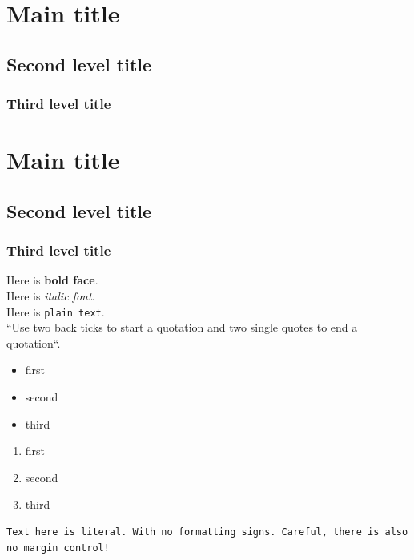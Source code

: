 \documentclass{article}\usepackage[]{graphicx}\usepackage[]{color}
\begin{document}
\section*{Main title}

\subsection*{Second level title}

\subsubsection*{Third level title}


\section{Main title}

\subsection{Second level title}

\subsubsection{Third level title}

Here is \textbf{bold face}.\\
Here is \textit{italic font}.\\
Here is \texttt{plain text}.\\

``Use two back ticks to start a quotation and two single quotes to end a quotation``.

\begin{itemize}
  \item first
  \item second
  \item third
\end{itemize}

\begin{enumerate}
  \item first
  \item second
  \item third
\end{enumerate}

\begin{verbatim}
Text here is literal. With no formatting signs. Careful, there is also no margin control!
\end{verbatim}
\end{document}
